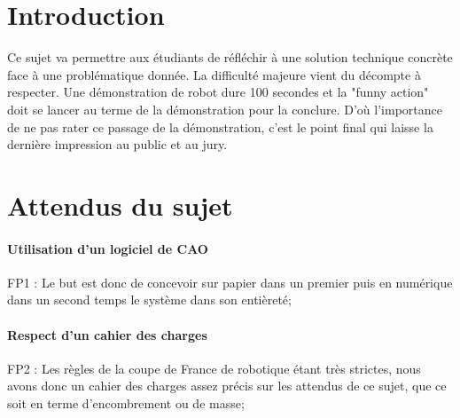 \documentclass[fleqn,10pt]{SelfArx} %
\begin{document}
\flushbottom %

\maketitle %

\tableofcontents %

\thispagestyle{empty} %


\section*{Introduction} %


Ce sujet va permettre aux étudiants de réfléchir à une solution technique concrète face à une problématique donnée. La difficulté majeure vient du décompte à respecter. Une démonstration de robot dure 100 secondes et la "funny action" doit se lancer au terme de la démonstration pour la conclure. D'où l'importance de ne pas rater ce passage de la démonstration, c'est le point final qui laisse la dernière impression au public et au jury.



\section{Attendus du sujet}

\paragraph{Utilisation d’un logiciel de CAO}
FP1 : Le but est donc de concevoir sur papier dans un premier puis en numérique dans un second temps le système dans son entièreté;
\paragraph{Respect d’un cahier des charges}
FP2 : Les règles de la coupe de France de robotique étant très strictes, nous avons donc un cahier des charges assez précis sur les attendus de ce sujet, que ce soit en terme d'encombrement ou de masse;
\end{document}
